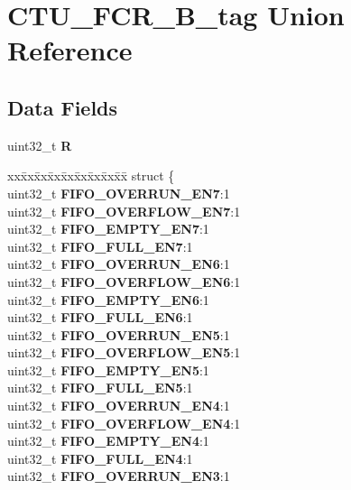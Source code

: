 \hypertarget{unionCTU__FCR__32B__tag}{}\section{C\+T\+U\+\_\+\+F\+C\+R\+\_\+B\+\_\+tag Union Reference}
\label{unionCTU__FCR__32B__tag}
\subsection*{Data Fields}
\begin{DoxyCompactItemize}
\item 
\mbox{\label{unionCTU__FCR__32B__tag_ab6ed274b2cef4186af1108401f88d895}} 
uint32\+\_\+t {\bfseries R}
\item 
\mbox{\label{unionCTU__FCR__32B__tag_a9527a66ed87a6bfaf50315e68040f70a}} 
\begin{tabbing}
xx\=xx\=xx\=xx\=xx\=xx\=xx\=xx\=xx\=\kill
struct \{\\
\>uint32\_t {\bfseries FIFO\_OVERRUN\_EN7}:1\\
\>uint32\_t {\bfseries FIFO\_OVERFLOW\_EN7}:1\\
\>uint32\_t {\bfseries FIFO\_EMPTY\_EN7}:1\\
\>uint32\_t {\bfseries FIFO\_FULL\_EN7}:1\\
\>uint32\_t {\bfseries FIFO\_OVERRUN\_EN6}:1\\
\>uint32\_t {\bfseries FIFO\_OVERFLOW\_EN6}:1\\
\>uint32\_t {\bfseries FIFO\_EMPTY\_EN6}:1\\
\>uint32\_t {\bfseries FIFO\_FULL\_EN6}:1\\
\>uint32\_t {\bfseries FIFO\_OVERRUN\_EN5}:1\\
\>uint32\_t {\bfseries FIFO\_OVERFLOW\_EN5}:1\\
\>uint32\_t {\bfseries FIFO\_EMPTY\_EN5}:1\\
\>uint32\_t {\bfseries FIFO\_FULL\_EN5}:1\\
\>uint32\_t {\bfseries FIFO\_OVERRUN\_EN4}:1\\
\>uint32\_t {\bfseries FIFO\_OVERFLOW\_EN4}:1\\
\>uint32\_t {\bfseries FIFO\_EMPTY\_EN4}:1\\
\>uint32\_t {\bfseries FIFO\_FULL\_EN4}:1\\
\>uint32\_t {\bfseries FIFO\_OVERRUN\_EN3}:1\\

\end{tabbing}
\end{DoxyCompactItemize}
